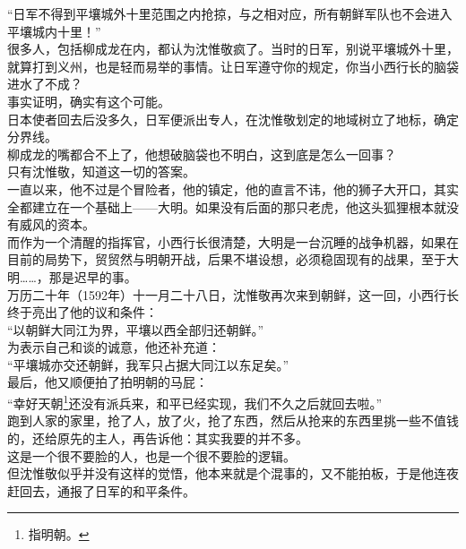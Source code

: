 \begin{multicols}{\theparacolNo}
“日军不得到平壤城外十里范围之内抢掠，与之相对应，所有朝鲜军队也不会进入平壤城内十里！”\\

很多人，包括柳成龙在内，都认为沈惟敬疯了。当时的日军，别说平壤城外十里，就算打到义州，也是轻而易举的事情。让日军遵守你的规定，你当小西行长的脑袋进水了不成？\\

事实证明，确实有这个可能。\\

日本使者回去后没多久，日军便派出专人，在沈惟敬划定的地域树立了地标，确定分界线。\\

柳成龙的嘴都合不上了，他想破脑袋也不明白，这到底是怎么一回事？\\

只有沈惟敬，知道这一切的答案。\\

一直以来，他不过是个冒险者，他的镇定，他的直言不讳，他的狮子大开口，其实全都建立在一个基础上——大明。如果没有后面的那只老虎，他这头狐狸根本就没有威风的资本。\\

而作为一个清醒的指挥官，小西行长很清楚，大明是一台沉睡的战争机器，如果在目前的局势下，贸贸然与明朝开战，后果不堪设想，必须稳固现有的战果，至于大明……，那是迟早的事。\\

万历二十年（1592年）十一月二十八日，沈惟敬再次来到朝鲜，这一回，小西行长终于亮出了他的议和条件：\\

“以朝鲜大同江为界，平壤以西全部归还朝鲜。”\\

为表示自己和谈的诚意，他还补充道：\\

“平壤城亦交还朝鲜，我军只占据大同江以东足矣。”\\

最后，他又顺便拍了拍明朝的马屁：\\

“幸好天朝\footnote{指明朝。}还没有派兵来，和平已经实现，我们不久之后就回去啦。”\\

跑到人家的家里，抢了人，放了火，抢了东西，然后从抢来的东西里挑一些不值钱的，还给原先的主人，再告诉他：其实我要的并不多。\\

这是一个很不要脸的人，也是一个很不要脸的逻辑。\\

但沈惟敬似乎并没有这样的觉悟，他本来就是个混事的，又不能拍板，于是他连夜赶回去，通报了日军的和平条件。\\


\end{multicols}
